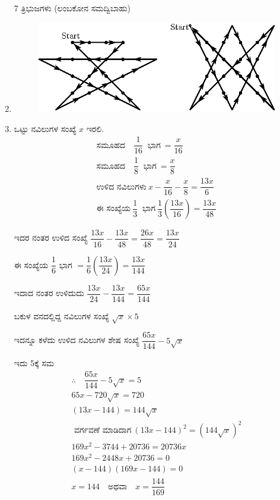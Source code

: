 \begin{enumerate}
7 ತ್ರಿಭುಜಗಳು (ಲಂಬಕೋನ ಸಮದ್ವಿಬಾಹು)

\item 
\begin{figure}[H]
\centering
\includegraphics{images/chap11/ans17.eps}
\end{figure}

\item  ಒಟ್ಟು ನವಿಲುಗಳ ಸಂಖ್ಯೆ $x$ ಇರಲಿ. 
\begin{gather*}
\text{ಸಮೂಹದ}\quad\dfrac{1}{16} ~\text{ ಭಾಗ}~ = \dfrac{x}{16}\\
\text{ಸಮೂಹದ}\quad\dfrac{1}{8} ~\text{ ಭಾಗ}~ = \dfrac{x}{8}\\
\text{ಉಳಿದ ನವಿಲುಗಳು}~ x - \dfrac{x}{16} - \dfrac{x}{8} = \dfrac{13x}{6}\\
\text{ಈ ಸಂಖ್ಯೆಯ}~ \dfrac{1}{3} ~\text{ ಭಾಗ}~ \dfrac{1}{3}\left(\dfrac{13x}{16}\right) = \dfrac{13x}{48}
\end{gather*}

ಇದರ ನಂತರ ಉಳಿದ ಸಂಖ್ಯೆ $\dfrac{13x}{16} - \dfrac{13x}{48} = \dfrac{26x}{48} = \dfrac{13x}{24}$

ಈ ಸಂಖ್ಯೆಯ $\dfrac{1}{6}$ ಭಾಗ  $= \dfrac{1}{6} \left(\dfrac{13x}{24}\right) = \dfrac{13x}{144}$

ಇದಾದ ನಂತರ ಉಳಿದುದು $\dfrac{13x}{24} - \dfrac{13x}{144} = \dfrac{65x}{144}$

ಬಕುಳ ವನದಲ್ಲಿದ್ದ ನವಿಲುಗಳ ಸಂಖ್ಯೆ $\sqrt{x} \times 5$

ಇದನ್ನೂ ಕಳೆದು ಉಳಿದ ನವಿಲುಗಳ ಶೇಷ ಸಂಖ್ಯೆ $\dfrac{65x}{144} - 5\sqrt{x}$

ಇದು 5ಕ್ಕೆ ಸಮ 
\begin{gather*}
\therefore\quad \dfrac{65x}{144} - 5\sqrt{x} = 5\\
65x - 720\sqrt{x} = 720\\
(13x - 144) = 144\sqrt{x}\\
\text{ ವರ್ಗವಣೆ ಮಾಡಿದಾಗ}~ (13x - 144)^{2} = (144\sqrt{x})^{2}\\
169x^{2} - 3744 + 20736 = 20736x\\
169x^{2} - 2448x + 20736 = 0\\
(x - 144)(169x - 144) = 0\\
x = 144 \quad\text{ಅಥವಾ}\quad x = \dfrac{144}{169}
\end{gather*}


\end{enumerate}
